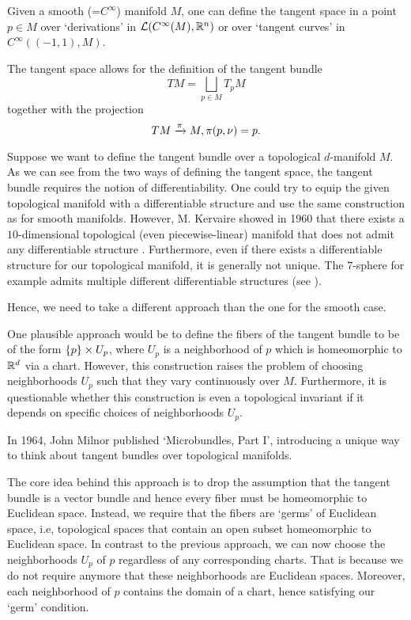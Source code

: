 \begin{myparagraph} Given a smooth (=$C^\infty$) manifold $M$, one can define the tangent space in a point $p \in M$ over `derivations' in $\mathcal{L}(C^\infty(M), \mathbb{R}^n)$ or over `tangent curves' in $C^\infty((-1, 1), M)$.

The tangent space allows for the definition of the tangent bundle \[ TM = \bigsqcup_{p \in M} T_p M\] together with the projection \[ TM \xrightarrow{\pi} M, \pi(p, \nu) = p. \]

Suppose we want to define the tangent bundle over a topological $d$-manifold $M$. As we can see from the two ways of defining the tangent space, the tangent bundle requires the notion of differentiability. One could try to equip the given topological manifold with a differentiable structure and use the same construction as for smooth manifolds. However, M. Kervaire showed in 1960 that there exists a $10$-dimensional topological (even piecewise-linear) manifold that does not admit any differentiable structure \cite{kervaire}. Furthermore, even if there exists a differentiable structure for our topological manifold, it is generally not unique. The $7$-sphere for example admits multiple different differentiable structures (see \cite{milnor7sphere}).

Hence, we need to take a different approach than the one for the smooth case.

One plausible approach would be to define the fibers of the tangent bundle to be of the form $\{p\} \times U_p$, where $U_p$ is a neighborhood of $p$ which is homeomorphic to $\mathbb{R}^d$ via a chart. However, this construction raises the problem of choosing neighborhoods $U_p$ such that they vary continuously over $M$. Furthermore, it is questionable whether this construction is even a topological invariant if it depends on specific choices of neighborhoods $U_p$.

In 1964, John Milnor published `Microbundles, Part I', introducing a unique way to think about tangent bundles over topological manifolds.

The core idea behind this approach is to drop the assumption that the tangent bundle is a vector bundle and hence every fiber must be homeomorphic to Euclidean space. Instead, we require that the fibers are `germs' of Euclidean space, i.e, topological spaces that contain an open subset homeomorphic to Euclidean space. In contrast to the previous approach, we can now choose the neighborhoods $U_p$ of $p$ regardless of any corresponding charts. That is because we do not require anymore that these neighborhoods are Euclidean spaces. Moreover, each neighborhood of $p$ contains the domain of a chart, hence satisfying our `germ' condition.


\end{myparagraph}
